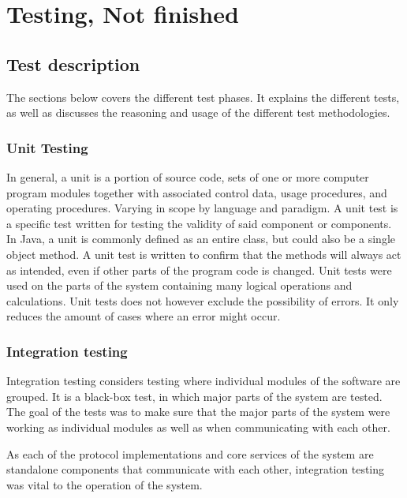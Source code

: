 
\chapter{Testing, Not finished}
\label{ch:testing}

\section{Test description}
\label{sec:testing-test_description}

The sections below covers the different test phases. It explains the different tests, as well as discusses the reasoning and usage of the different test methodologies.

\subsection{Unit Testing}
\label{subsec:testing-test_description-unit_testing}

In general, a unit is a portion of source code, sets of one or more computer program modules together with associated control data, usage procedures, and operating procedures. Varying in scope by language and paradigm. A unit test is a specific test written for testing the validity of said component or components. In Java, a unit is commonly defined as an entire class, but could also be a single object method. A unit test is written to confirm that the methods will always act as intended, even if other parts of the program code is changed. Unit tests were used on the parts of the system containing many logical operations and calculations. Unit tests does not however exclude the possibility of errors. It only reduces the amount of cases where an error might occur.

\subsection{Integration testing}
\label{subsec:testing-test_description-integration_testing}

Integration testing considers testing where individual modules of the software are grouped. It is a black-box test, in which major parts of the system are tested. The goal of the tests was to make sure that the major parts of the system were working as individual modules as well as when communicating with each other.

As each of the protocol implementations and core services of the system are standalone components that communicate with each other, integration testing was vital to the operation of the system.

